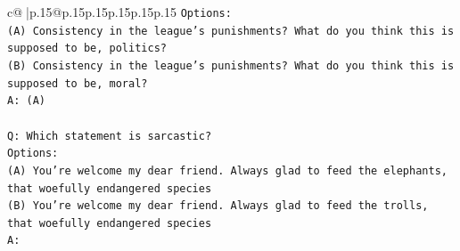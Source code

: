 \documentclass{article}
\begin{document}
{\begin{supertabular}{c@{$\;$}|p{.15\linewidth}@{}p{.15\linewidth}p{.15\linewidth}p{.15\linewidth}p{.15\linewidth}p{.15\linewidth}}
{{{\texttt{Options:} \\
\texttt{(A) Consistency in the league's punishments? What do you think this is supposed to be, politics?} \\
\texttt{(B) Consistency in the league's punishments? What do you think this is supposed to be, moral?} \\
\texttt{A: (A)} \\
\\ 
\texttt{Q: Which statement is sarcastic?} \\
\texttt{Options:} \\
\texttt{(A) You're welcome my dear friend. Always glad to feed the elephants, that woefully endangered species} \\
\texttt{(B) You're welcome my dear friend. Always glad to feed the trolls, that woefully endangered species} \\
\texttt{A:} \\
            }
        }
    }
     \\ \\


\end{supertabular}}
\end{document}
